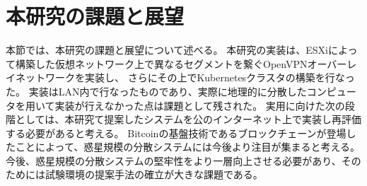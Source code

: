 \section{本研究の課題と展望}
\label{conclusion:issue}

本節では、本研究の課題と展望について述べる。
本研究の実装は、ESXiによって構築した仮想ネットワーク上で異なるセグメントを繋ぐOpenVPNオーバーレイネットワークを実装し、
さらにその上でKubernetesクラスタの構築を行なった。
実装はLAN内で行なったものであり、実際に地理的に分散したコンピュータを用いて実装が行えなかった点は課題として残された。
実用に向けた次の段階としては、本研究て提案したシステムを公のインターネット上で実装し再評価する必要があると考える。
Bitcoinの基盤技術であるブロックチェーンが登場したことによって、惑星規模の分散システムには今後より注目が集まると考える。
今後、惑星規模の分散システムの堅牢性をより一層向上させる必要があり、そのためには試験環境の提案手法の確立が大きな課題である。

